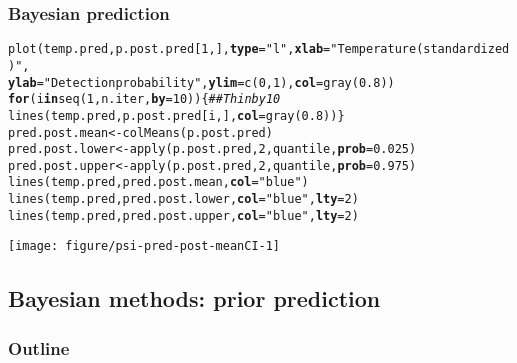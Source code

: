 \documentclass[color=usenames,dvipsnames]{beamer}\usepackage[]{graphicx}\usepackage[]{xcolor}
\makeatletter
\newcommand{\hlnum}[1]{\textcolor[rgb]{0.69,0.494,0}{#1}}%
\newcommand{\hlstr}[1]{\textcolor[rgb]{0.749,0.012,0.012}{#1}}%
\newcommand{\hlcom}[1]{\textcolor[rgb]{0.514,0.506,0.514}{\textit{#1}}}%
\newcommand{\hlstd}[1]{\textcolor[rgb]{0,0,0}{#1}}%
\newcommand{\hlkwa}[1]{\textcolor[rgb]{0,0,0}{\textbf{#1}}}%
\newcommand{\hlkwb}[1]{\textcolor[rgb]{0,0.341,0.682}{#1}}%
\newcommand{\hlkwc}[1]{\textcolor[rgb]{0,0,0}{\textbf{#1}}}%
\newcommand{\hlkwd}[1]{\textcolor[rgb]{0.004,0.004,0.506}{#1}}%
\newenvironment{kframe}{%
 \def\at@end@of@kframe{}%
 \ifinner\ifhmode%
  \def\at@end@of@kframe{\end{minipage}}%
  \begin{minipage}{\columnwidth}%
 \fi\fi%
 \def\FrameCommand##1{\hskip\@totalleftmargin \hskip-\fboxsep
 \colorbox{shadecolor}{##1}\hskip-\fboxsep
     \hskip-\linewidth \hskip-\@totalleftmargin \hskip\columnwidth}%
 \MakeFramed {\advance\hsize-\width
   \@totalleftmargin\z@ \linewidth\hsize
   \@setminipage}}%
 {\par\unskip\endMakeFramed%
 \at@end@of@kframe}
\newenvironment{knitrout}{}{} %
\makeatother
\begin{document}
\begin{frame}[fragile]
  \frametitle{Bayesian prediction}
\begin{knitrout}\tiny
{}\color{fgcolor}\begin{kframe}
\begin{alltt}
\hlkwd{plot}\hlstd{(temp.pred, p.post.pred[}\hlnum{1}\hlstd{,],} \hlkwc{type}\hlstd{=}\hlstr{"l"}\hlstd{,} \hlkwc{xlab}\hlstd{=}\hlstr{"Temperature (standardized)"}\hlstd{,}
     \hlkwc{ylab}\hlstd{=}\hlstr{"Detection probability"}\hlstd{,} \hlkwc{ylim}\hlstd{=}\hlkwd{c}\hlstd{(}\hlnum{0}\hlstd{,} \hlnum{1}\hlstd{),} \hlkwc{col}\hlstd{=}\hlkwd{gray}\hlstd{(}\hlnum{0.8}\hlstd{))}
\hlkwa{for}\hlstd{(i} \hlkwa{in} \hlkwd{seq}\hlstd{(}\hlnum{1}\hlstd{, n.iter,} \hlkwc{by}\hlstd{=}\hlnum{10}\hlstd{)) \{}  \hlcom{## Thin by 10}
    \hlkwd{lines}\hlstd{(temp.pred, p.post.pred[i,],} \hlkwc{col}\hlstd{=}\hlkwd{gray}\hlstd{(}\hlnum{0.8}\hlstd{))  \}}
\hlstd{pred.post.mean} \hlkwb{<-} \hlkwd{colMeans}\hlstd{(p.post.pred)}
\hlstd{pred.post.lower} \hlkwb{<-} \hlkwd{apply}\hlstd{(p.post.pred,} \hlnum{2}\hlstd{, quantile,} \hlkwc{prob}\hlstd{=}\hlnum{0.025}\hlstd{)}
\hlstd{pred.post.upper} \hlkwb{<-} \hlkwd{apply}\hlstd{(p.post.pred,} \hlnum{2}\hlstd{, quantile,} \hlkwc{prob}\hlstd{=}\hlnum{0.975}\hlstd{)}
\hlkwd{lines}\hlstd{(temp.pred, pred.post.mean,} \hlkwc{col}\hlstd{=}\hlstr{"blue"}\hlstd{)}
\hlkwd{lines}\hlstd{(temp.pred, pred.post.lower,} \hlkwc{col}\hlstd{=}\hlstr{"blue"}\hlstd{,} \hlkwc{lty}\hlstd{=}\hlnum{2}\hlstd{)}
\hlkwd{lines}\hlstd{(temp.pred, pred.post.upper,} \hlkwc{col}\hlstd{=}\hlstr{"blue"}\hlstd{,} \hlkwc{lty}\hlstd{=}\hlnum{2}\hlstd{)}
\end{alltt}
\end{kframe}

{\centering \texttt{[image: figure/psi-pred-post-meanCI-1]} 

}


\end{knitrout}
\end{frame}





\subsection{Bayesian methods: prior prediction}



\begin{frame}[plain]
  \frametitle{Outline}
  \Large
\end{frame}
\end{document}
